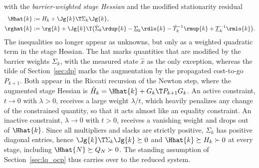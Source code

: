 with the \textit{barrier-weighted stage Hessian} and the modified stationarity residual
\begin{align}
    \Hhat{k} &:= H_k + \Jg{k}\T\Sigma_k\Jg{k} , \label{eq:Hhat}\\
    \rghat{k} &:= \rg{k} + \Jg{k}\T\big(\bar{\Sigma}_k\rdup{k} - \underline{\Sigma}_k\rdlo{k} - \bar{T}_k^{-1}\rmup{k} + \underline{T}_k^{-1}\rmlo{k}\big) . \label{eq:rghat}
\end{align}
The inequalities no longer appear as unknowns, but only as a weighted quadratic term in the stage Hessian.
The hat marks quantities that are modified by the barrier weights $\Sigma_k$, with the measured state $\hat{x}$ as the only exception, whereas the tilde of Section~\ref{sec:dp} marks the augmentation by the propagated cost-to-go $P_{k+1}$.
Both appear in the Riccati recursion of the Newton step, where the augmented stage Hessian is $\tilde{H}_k = \Hhat{k} + G_k\T P_{k+1} G_k$.
An active constraint, $t \to 0$ with $\lambda > 0$, receives a large weight $\lambda / t$, which heavily penalizes any change of the constrained quantity, so that it acts almost like an equality constraint.
An inactive constraint, $\lambda \to 0$ with $t > 0$, receives a vanishing weight and drops out of $\Hhat{k}$.
Since all multipliers and slacks are strictly positive, $\Sigma_k$ has positive diagonal entries, hence $\Jg{k}\T\Sigma_k\Jg{k} \succeq 0$ and $\Hhat{k} \succeq H_k \succ 0$ at every stage, including $\Hhat{N} \succeq Q_N \succ 0$.
The standing assumption of Section~\ref{sec:lq_ocp} thus carries over to the reduced system.

